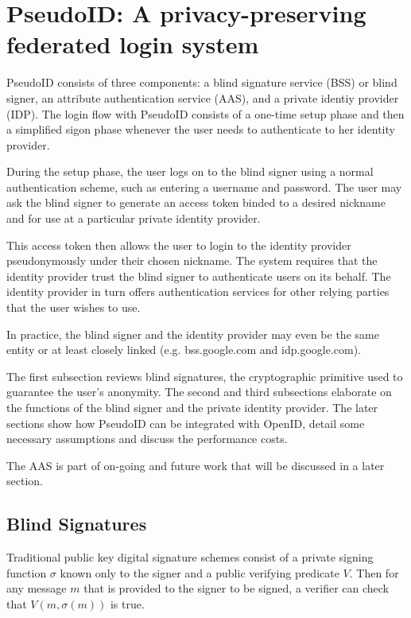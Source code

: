 \documentclass{llncs}
\begin{document}
\section{PseudoID: A privacy-preserving federated login system}
\label{sec:pseudoid}

PseudoID consists of three components: a blind signature service (BSS) or blind
signer, an attribute authentication service (AAS), and a private identiy
provider (IDP). The login flow with PseudoID consists of a one-time setup phase
and then a simplified sigon phase whenever the user needs to authenticate to her
identity provider.

During the setup phase, the user logs on to the blind signer using a normal
authentication scheme, such as entering a username and password. The user may
ask the blind signer to generate an access token binded to a desired nickname
and for use at a particular private identity provider.

This access token then allows the user to login to the identity provider
pseudonymously under their chosen nickname. The system requires that the
identity provider trust the blind signer to authenticate users on its behalf.
The identity provider in turn offers authentication services for other relying
parties that the user wishes to use.

In practice, the blind signer and the identity provider may even be the same
entity or at least closely linked (e.g. bss.google.com and idp.google.com).

The first subsection reviews blind signatures, the cryptographic primitive used
to guarantee the user's anonymity. The second and third subsections elaborate on
the functions of the blind signer and the private identity provider. The later
sections show how PseudoID can be integrated with OpenID, detail some necessary
assumptions and discuss the performance costs.

The AAS is part of on-going and future work that will be discussed in a later
section.

\subsection{Blind Signatures}

Traditional public key digital signature schemes \cite{DH76} consist of a
private signing function $\sigma$ known only to the signer and a public verifying
predicate $V$. Then for any message $m$ that is provided to the signer to be
signed, a verifier can check that $V(m, \sigma(m))$ is true.
\end{document}

